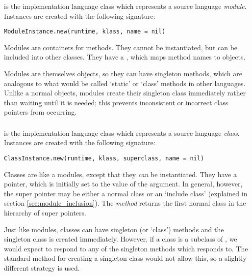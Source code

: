 \subsubsection{}

 is the implementation language class which represents a source language \textit{module}. Instances are created with the following signature:

\begin{lstlisting}
ModuleInstance.new(runtime, klass, name = nil)
\end{lstlisting}

Modules are containers for methods. They cannot be instantiated, but can be included into other classes. They have a , which maps method names to  objects.

Modules are themselves objects, so they can have singleton methods, which are analogous to what would be called `static' or `class' methods in other languages. Unlike a normal objects, modules create their singleton class immediately rather than waiting until it is needed; this prevents inconsistent or incorrect class pointers from occurring.

\subsubsection{}

 is the implementation language class which represents a source language \textit{class}. Instances are created with the following signature:

\begin{lstlisting}
ClassInstance.new(runtime, klass, superclass, name = nil)
\end{lstlisting}

Classes are like a modules, except that they \textit{can} be instantiated. They have a  pointer, which is initially set to the value of the  argument. In general, however, the super pointer may be either a normal class or an `include class' (explained in section \ref{sec:module_inclusion}). The  \textit{method} returns the first normal class in the hierarchy of super pointers.

Just like modules, classes can have singleton (or `class') methods and the singleton class is created immediately. However, if a class  is a subclass of , we would expect  to respond to any of the singleton methods which  responds to. The standard method for creating a singleton class would not allow this, so a slightly different strategy is used.

